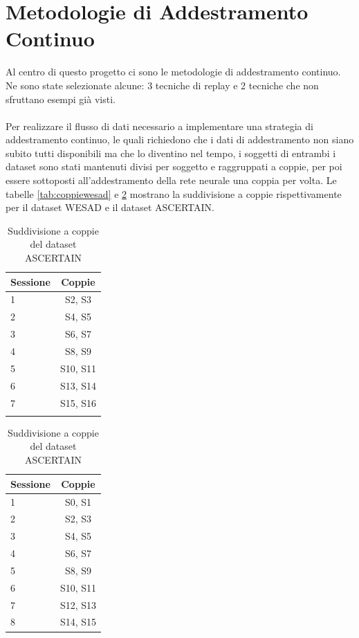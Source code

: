 \section{Metodologie di Addestramento Continuo}
Al centro di questo progetto ci sono le metodologie di addestramento continuo. Ne sono state selezionate alcune: 3 tecniche di replay e 2 tecniche che non sfruttano esempi già visti.\\\\
Per realizzare il flusso di dati necessario a implementare una strategia di addestramento continuo, le quali richiedono che i dati di addestramento non siano subito tutti disponibili ma che lo diventino nel tempo, i soggetti di entrambi i dataset sono stati mantenuti divisi per soggetto e raggruppati a coppie, per poi essere sottoposti all'addestramento della rete neurale una coppia per volta. Le tabelle \ref{tab:coppiewesad} e \ref{tab:coppieascertain} mostrano la suddivisione a coppie rispettivamente per il dataset WESAD e il dataset ASCERTAIN.
\begin{table}[h]
    \parbox{.45\linewidth}{
    	\begin{center}
    		\begin{tabular}{l|c}
    		     \textbf{Sessione} & \textbf{Coppie}\\
    		     \hline
    		     1 & S2, S3 \\
    		     2 & S4, S5 \\
    		     3 & S6, S7 \\
    		     4 & S8, S9 \\
    		     5 & S10, S11 \\
    		     6 & S13, S14 \\
    		     7 & S15, S16 \\
    		     \multicolumn{1}{c}{}
    		\end{tabular}
    		\caption{Suddivisione a coppie del dataset WESAD}
    		\label{tab:coppiewesad}
    	\end{center}
	}
    \parbox{.45\linewidth}{
    	\begin{center}
    		\begin{tabular}{l|c}
    		     \textbf{Sessione} & \textbf{Coppie}\\
    		     \hline
    		     1 & S0, S1 \\
    		     2 & S2, S3 \\
    		     3 & S4, S5 \\
    		     4 & S6, S7 \\
    		     5 & S8, S9 \\
    		     6 & S10, S11 \\
    		     7 & S12, S13 \\
    		     8 & S14, S15 \\
    		\end{tabular}
    		\caption{Suddivisione a coppie del dataset ASCERTAIN}
    		\label{tab:coppieascertain}
    	\end{center}
    }
\end{table}\\
